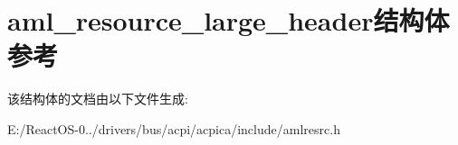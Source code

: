 \hypertarget{structaml__resource__large__header}{}\section{aml\+\_\+resource\+\_\+large\+\_\+header结构体 参考}
\label{structaml__resource__large__header}


该结构体的文档由以下文件生成\+:\begin{DoxyCompactItemize}
\item 
E\+:/\+React\+O\+S-\/0../drivers/bus/acpi/acpica/include/amlresrc.\+h\end{DoxyCompactItemize}
